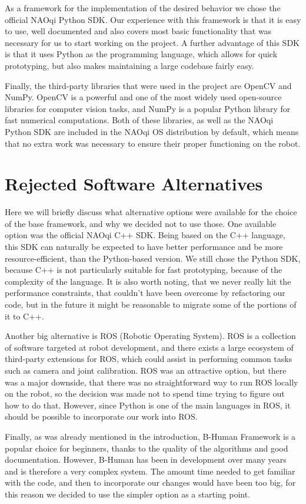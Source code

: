 As a framework for the implementation of the desired behavior we chose the
official NAOqi Python SDK. Our experience with this framework is that it is
easy to use, well documented and also covers most basic functionality that was
necessary for us to start working on the project. A further advantage of this
SDK is that it uses Python as the programming language, which allows for quick
prototyping, but also makes maintaining a large codebase fairly easy.

Finally, the third-party libraries that were used in the project are OpenCV and
NumPy. OpenCV is a powerful and one of the most widely used open-source
libraries for computer vision tasks, and NumPy is a popular Python library for
fast numerical computations. Both of these libraries, as well as the NAOqi
Python SDK are included in the NAOqi OS distribution by default, which means
that no extra work was necessary to ensure their proper functioning on the
robot.

\section{Rejected Software Alternatives}

Here we will briefly discuss what alternative options were available for the
choice of the base framework, and why we decided not to use those. One
available option was the official NAOqi C++ SDK. Being based on the C++
language, this SDK can naturally be expected to have better performance and be
more resource-efficient, than the Python-based version. We still chose the
Python SDK, because C++ is not particularly suitable for fast prototyping,
because of the complexity of the language. It is also worth noting, that we
never really hit the performance constraints, that couldn't have been overcome
by refactoring our code, but in the future it might be reasonable to migrate
some of the portions of it to C++.

Another big alternative is ROS (Robotic Operating System). ROS is a collection
of software targeted at robot development, and there exists a large ecosystem
of third-party extensions for ROS, which could assist in performing common
tasks such as camera and joint calibration. ROS was an attractive option, but
there was a major downside, that there was no straightforward way to run ROS
locally on the robot, so the decision was made not to spend time trying to
figure out how to do that. However, since Python is one of the main languages
in ROS, it should be possible to incorporate our work into ROS.

Finally, as was already mentioned in the introduction, B-Human Framework is a
popular choice for beginners, thanks to the quality of the algorithms and good
documentation. However, B-Human has been in development over many years and is
therefore a very complex system. The amount time needed to get familiar with
the code, and then to incorporate our changes would have been too big, for this
reason we decided to use the simpler option as a starting point.
